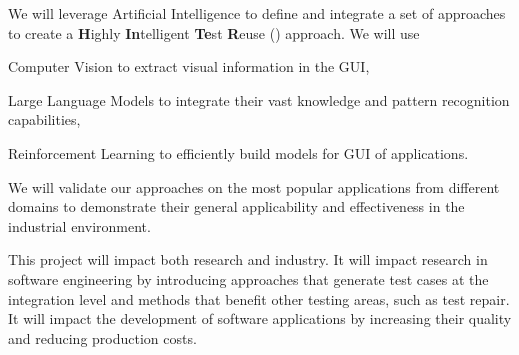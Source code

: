 
We will leverage Artificial Intelligence to define and integrate a set of \testreuse approaches to create a  \textbf{H}ighly \textbf{In}telligent \textbf{Te}st \textbf{R}euse (\project) approach.
We will use 
\begin{inparaenum}[(i)]
\item Computer Vision to extract visual information in the GUI,
\item  Large Language Models to integrate their vast knowledge and pattern recognition capabilities,
\item Reinforcement Learning to efficiently build models for  GUI of applications.
\end{inparaenum}
We will validate our approaches on the most popular applications from different domains to demonstrate their general applicability and effectiveness in the industrial environment.



This project will impact both research and industry. 
It will impact research in software engineering by introducing approaches that generate test cases at the integration level and methods that benefit other testing areas, such as test repair. 
It will impact the development of software applications by increasing their quality and reducing production costs.




























